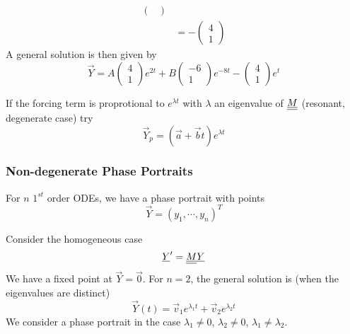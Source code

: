 \documentclass{article}
\begin{document}
\begin{eg}
\begin{align*}
\begin{pmatrix}
        \end{pmatrix} \\
        &= -\begin{pmatrix}
            4 \\ 1
        \end{pmatrix}
    \end{align*}
    A general solution is then given by
    \[
        \vec Y = A \begin{pmatrix}
            4 \\ 1
        \end{pmatrix}e^{2t}
        + B \begin{pmatrix}
            -6 \\ 1
        \end{pmatrix}e^{-8t}
        -\begin{pmatrix}
            4 \\ 1
        \end{pmatrix} e^t
    \]
\end{eg}
\begin{remark}
    If the forcing term is proprotional to $e^{\lambda t}$ with $\lambda$ an eigenvalue of $\underline{\underline{M}}$ (resonant, degenerate case)
    try
    \[
        \vec Y_p = (\vec a + \vec b t) e^{\lambda t}  
    \]
\end{remark}

\subsubsection{Non-degenerate Phase Portraits}
For $n$ $1^{st}$ order ODEs, we have a phase portrait with points
\[
    \vec Y = (y_1, \cdots, y_n)^T
\]

Consider the homogeneous case
\[
    \underline{Y}' = \underline{\underline{M}} \underline{Y}
\]
We have a fixed point at $\vec Y = \vec 0$. 
For $n = 2$, the general solution is (when the eigenvalues are distinct)
\[
    \vec Y(t) = \vec v_1 e^{\lambda_1 t} + \vec v_2 e^{\lambda_2 t}
\]
We consider a phase portrait in the case $\lambda_1 \neq 0$, $\lambda_2 \neq 0$, $\lambda_1 \neq \lambda_2$.
\end{document}
